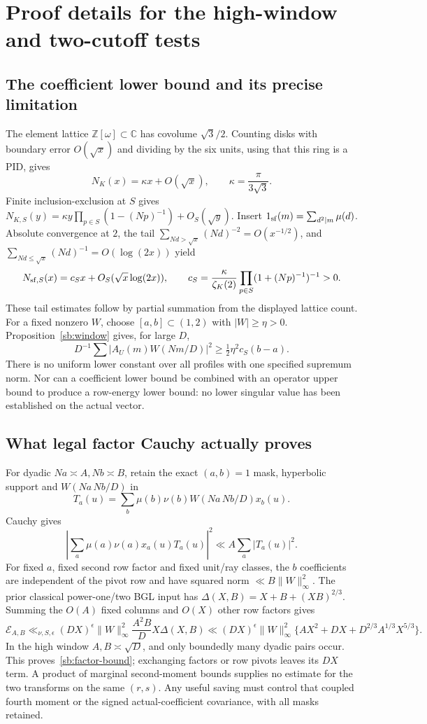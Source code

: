 \documentclass[11pt]{article}
\theoremstyle{definition}\newtheorem{definition}[theorem]{Definition}
\theoremstyle{remark}\newtheorem{remark}[theorem]{Remark}
\begin{document}
\section{Proof details for the high-window and two-cutoff tests}\label{sb:details}
\subsection{The coefficient lower bound and its precise limitation}
The element lattice $\mathbb Z[\omega]\subset\mathbb C$ has covolume
$\sqrt3/2$. Counting disks with boundary error $O(\sqrt x)$ and dividing
by the six units, using that this ring is a PID, gives
\[
 N_K(x)=\kappa x+O(\sqrt x),\qquad \kappa=\frac{\pi}{3\sqrt3}.
\]
Finite inclusion-exclusion at $S$ gives
$N_{K,S}(y)=\kappa y\prod_{p\in S}(1-(Np)^{-1})+O_S(\sqrt y)$.
Insert $1_{\rm sf}(m)=\sum_{d^2\mid m}\mu(d)$. Absolute convergence at
$2$, the tail $\sum_{Nd>\sqrt x}(Nd)^{-2}=O(x^{-1/2})$, and
$\sum_{Nd\le\sqrt x}(Nd)^{-1}=O(\log(2x))$ yield
\[
 N_{{\rm sf},S}(x)=c_Sx+O_S(\sqrt x\log(2x)),\qquad
 c_S=\frac{\kappa}{\zeta_K(2)}\prod_{p\in S}(1+(Np)^{-1})^{-1}>0.
\]
These tail estimates follow by partial summation from the displayed lattice
count. For a fixed nonzero $W$, choose $[a,b]\subset(1,2)$ with
$|W|\ge\eta>0$. Proposition~\ref{sb:window} gives, for large $D$,
\[
 D^{-1}\sum|A_U(m)W(Nm/D)|^2\ge\tfrac12\eta^2c_S(b-a).
\]
There is no uniform lower constant over all profiles with one specified
supremum norm. Nor can a coefficient lower bound be combined with an
operator upper bound to produce a row-energy lower bound: no lower singular
value has been established on the actual vector.

\subsection{What legal factor Cauchy actually proves}
For dyadic $Na\asymp A,Nb\asymp B$, retain the exact $(a,b)=1$ mask,
hyperbolic support and $W(Na\,Nb/D)$ in
\[
 T_a(u)=\sum_b\mu(b)\nu(b)W(Na\,Nb/D)x_b(u).
\]
Cauchy gives
\[
 |\sum_a\mu(a)\nu(a)x_a(u)T_a(u)|^2\ll A\sum_a|T_a(u)|^2.
\]
For fixed $a$, fixed second row factor and fixed unit/ray classes, the
$b$ coefficients are independent of the pivot row and have squared norm
$\ll B\|W\|_\infty^2$. The prior classical power-one/two BGL input has
$\Delta(X,B)=X+B+(XB)^{2/3}$. Summing the $O(A)$ fixed columns and
$O(X)$ other row factors gives
\[
 \mathcal E_{A,B}\ll_{\nu,S,\epsilon}(DX)^\epsilon\|W\|_\infty^2
 \frac{A^2B}{D}X\Delta(X,B)
 \ll (DX)^\epsilon\|W\|_\infty^2
 \{AX^2+DX+D^{2/3}A^{1/3}X^{5/3}\}.
\]
In the high window $A,B\asymp\sqrt D$, and only boundedly many dyadic
pairs occur. This proves~\eqref{sb:factor-bound}; exchanging factors
or row pivots leaves its $DX$ term. A product of marginal second-moment
bounds supplies no estimate for the two transforms on the same $(r,s)$.
Any useful saving must control that coupled fourth moment or the signed
actual-coefficient covariance, with all masks retained.
\end{document}
